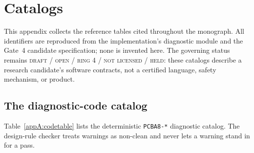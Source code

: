 \chapter{Catalogs}\label{appA:catalogs}

This appendix collects the reference tables cited throughout the monograph. All
identifiers are reproduced from the implementation's diagnostic module and the
Gate~4 candidate specification; none is invented here. The governing status
remains \textsc{draft / open / ring 4 / not licensed / held}: these catalogs
describe a research candidate's software contracts, not a certified language,
safety mechanism, or product.

\section{The diagnostic-code catalog}\label{appA:codes}

Table~\ref{appA:codetable} lists the deterministic \texttt{PCBA8-*} diagnostic
catalog. The design-rule checker treats warnings as non-clean and never lets a
warning stand in for a pass.

